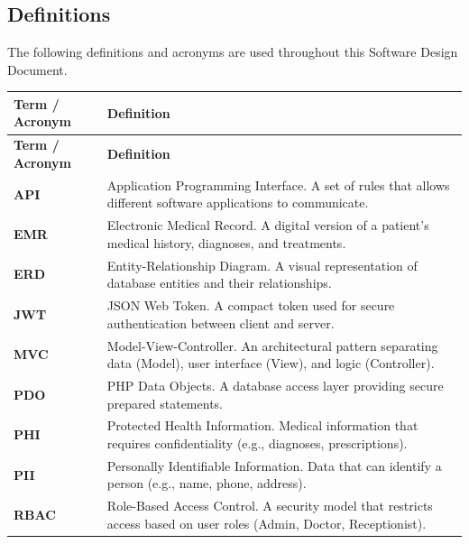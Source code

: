 \subsection{Definitions}

The following definitions and acronyms are used throughout this Software Design Document.

\renewcommand{\arraystretch}{1.5}
\begin{longtable}{p{} p{}}
	
	\toprule
	\rowcolor[gray]{0.9}
	\textbf{Term / Acronym} & \textbf{Definition} \\
	\midrule
	\endfirsthead
	
	\toprule
	\rowcolor[gray]{0.9}
	\textbf{Term / Acronym} & \textbf{Definition} \\
	\midrule
	\endhead
	
	\textbf{API} & Application Programming Interface. A set of rules that allows different software applications to communicate. \\
	
	\textbf{EMR} & Electronic Medical Record. A digital version of a patient's medical history, diagnoses, and treatments. \\
	
	\textbf{ERD} & Entity-Relationship Diagram. A visual representation of database entities and their relationships. \\
	
	\textbf{JWT} & JSON Web Token. A compact token used for secure authentication between client and server. \\
	
	\textbf{MVC} & Model-View-Controller. An architectural pattern separating data (Model), user interface (View), and logic (Controller). \\
	
	\textbf{PDO} & PHP Data Objects. A database access layer providing secure prepared statements. \\
	
	\textbf{PHI} & Protected Health Information. Medical information that requires confidentiality (e.g., diagnoses, prescriptions). \\
	
	\textbf{PII} & Personally Identifiable Information. Data that can identify a person (e.g., name, phone, address). \\
	
	\textbf{RBAC} & Role-Based Access Control. A security model that restricts access based on user roles (Admin, Doctor, Receptionist). \\
	

\end{longtable}
